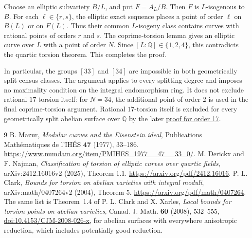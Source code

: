 \documentclass[11pt]{article}
\newcommand{\Q}{\mathbb Q}
\begin{document}
Choose an elliptic subvariety \(B/L\), and put \(F=A_L/B\). Then \(F\) is \(L\)-isogenous to \(B\). For each \(\ell\in\{r,s\}\), the elliptic exact sequence places a point of order \(\ell\) on \(B(L)\) or on \(F(L)\). Thus their common \(L\)-isogeny class contains curves with rational points of orders \(r\) and \(s\). The coprime-torsion lemma gives an elliptic curve over \(L\) with a point of order \(N\). Since \([L:\Q]\in\{1,2,4\}\), this contradicts the quartic torsion theorem. This completes the proof.

In particular, the groups \([33]\) and \([34]\) are impossible in both geometrically split census classes. The argument applies to every splitting degree and imposes no maximality condition on the integral endomorphism ring. It does not exclude rational \(17\)-torsion itself: for \(N=34\), the additional point of order \(2\) is used in the final coprime-torsion argument. Rational \(17\)-torsion itself is excluded for every geometrically split abelian surface over \(\Q\) by the later \href{https://genus-2-torsion.github.io/proofs/geometric-17-obstruction.html}{proof for order 17}.

\begin{thebibliography}{9}
B. Mazur, \emph{Modular curves and the Eisenstein ideal}, Publications Math\'ematiques de l'IH\'ES \textbf{47} (1977), 33--186.
\url{https://www.numdam.org/item/PMIHES_1977__47__33_0/}.
M. Derickx and F. Najman, \emph{Classification of torsion of elliptic curves over quartic fields}, arXiv:2412.16016v2 (2025), Theorem 1.1.
\url{https://arxiv.org/pdf/2412.16016}.
P. L. Clark, \emph{Bounds for torsion on abelian varieties with integral moduli}, arXiv:math/0407264v2 (2004), Theorem 5.
\url{https://arxiv.org/pdf/math/0407264}.
The same list is Theorem~1.4 of P. L. Clark and X. Xarles, \emph{Local bounds for torsion points on abelian varieties}, Canad. J. Math. \textbf{60} (2008), 532--555, \href{https://doi.org/10.4153/CJM-2008-026-x}{doi:10.4153/CJM-2008-026-x}, for abelian surfaces with everywhere anisotropic reduction, which includes potentially good reduction.
\end{thebibliography}
\end{document}

